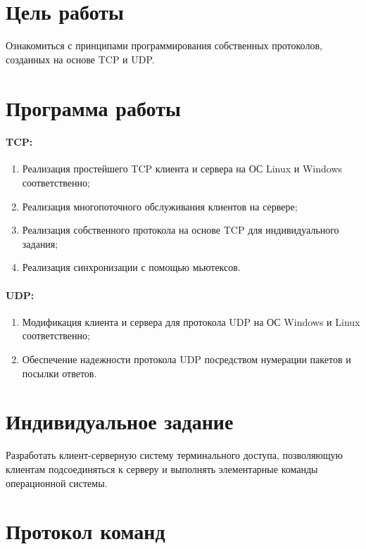 \section{Цель работы}

Ознакомиться с принципами программирования собственных протоколов, созданных на основе TCP и UDP.

\section{Программа работы}

\paragraph{TCP:}

\begin{enumerate}
	\item Реализация простейшего TCP клиента и сервера на ОС Linux и Windows соответственно;
	\item Реализация многопоточного обслуживания клиентов на сервере;
	\item Реализация собственного протокола на основе TCP для индивидуального задания;
	\item Реализация синхронизации с помощью мьютексов.
\end{enumerate}

\paragraph{UDP:}

\begin{enumerate}
	\item Модификация клиента и сервера для протокола UDP на ОС Windows и Linux соответственно;
	\item Обеспечение надежности протокола UDP посредством нумерации пакетов и посылки ответов.
\end{enumerate}

\section{Индивидуальное задание}

Разработать клиент-серверную систему терминального доступа, позволяющую клиентам подсоединяться к серверу и выполнять элементарные команды операционной системы.

\section{Протокол команд}

